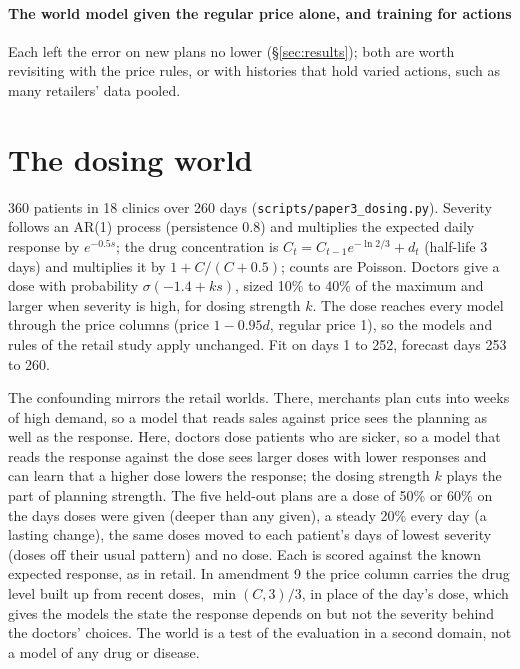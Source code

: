 \paragraph{The world model given the regular price alone, and training for actions} Each left the error on new plans
no lower (\S\ref{sec:results}); both are worth revisiting with the price rules, or with histories that hold varied
actions, such as many retailers' data pooled.


\section{The dosing world}\label{app:dosing}

360 patients in 18 clinics over 260 days (\texttt{scripts/paper3\_dosing.py}). Severity follows an AR(1) process
(persistence 0.8) and multiplies the expected daily response by $e^{-0.5 s}$; the drug concentration is
$C_t = C_{t-1} e^{-\ln 2/3} + d_t$ (half-life 3 days) and multiplies it by $1 + C/(C + 0.5)$; counts are Poisson.
Doctors give a dose with probability $\sigma(-1.4 + k s)$, sized 10\% to 40\% of the maximum and larger when severity
is high, for dosing strength $k$. The dose reaches every model through the price columns (price $1 - 0.95d$, regular
price 1), so the models and rules of the retail study apply unchanged. Fit on days 1 to 252, forecast days 253 to 260.

The confounding mirrors the retail worlds. There, merchants plan cuts into weeks of high demand, so a model that
reads sales against price sees the planning as well as the response. Here, doctors dose patients who are sicker, so
a model that reads the response against the dose sees larger doses with lower responses and can learn that a higher
dose lowers the response; the dosing strength $k$ plays the part of planning strength. The five held-out plans
are a dose of 50\% or 60\% on the days doses were given (deeper than any given), a steady 20\% every day (a lasting
change), the same doses moved to each patient's days of lowest severity (doses off their usual pattern) and no dose.
Each is scored against the known expected response, as in retail. In amendment 9 the price column carries the drug
level built up from recent doses, $\min(C, 3)/3$, in place of the day's dose, which gives the models the state the
response depends on but not the severity behind the doctors' choices. The world is a test of the evaluation in a
second domain, not a model of any drug or disease.




